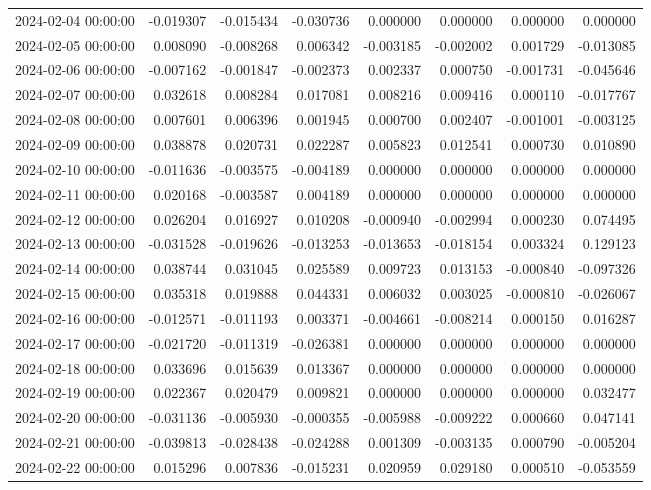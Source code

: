 \begin{tabular}{lrrrrrrr}
2024-02-04 00:00:00 & -0.019307 & -0.015434 & -0.030736 & 0.000000 & 0.000000 & 0.000000 & 0.000000 \\
2024-02-05 00:00:00 & 0.008090 & -0.008268 & 0.006342 & -0.003185 & -0.002002 & 0.001729 & -0.013085 \\
2024-02-06 00:00:00 & -0.007162 & -0.001847 & -0.002373 & 0.002337 & 0.000750 & -0.001731 & -0.045646 \\
2024-02-07 00:00:00 & 0.032618 & 0.008284 & 0.017081 & 0.008216 & 0.009416 & 0.000110 & -0.017767 \\
2024-02-08 00:00:00 & 0.007601 & 0.006396 & 0.001945 & 0.000700 & 0.002407 & -0.001001 & -0.003125 \\
2024-02-09 00:00:00 & 0.038878 & 0.020731 & 0.022287 & 0.005823 & 0.012541 & 0.000730 & 0.010890 \\
2024-02-10 00:00:00 & -0.011636 & -0.003575 & -0.004189 & 0.000000 & 0.000000 & 0.000000 & 0.000000 \\
2024-02-11 00:00:00 & 0.020168 & -0.003587 & 0.004189 & 0.000000 & 0.000000 & 0.000000 & 0.000000 \\
2024-02-12 00:00:00 & 0.026204 & 0.016927 & 0.010208 & -0.000940 & -0.002994 & 0.000230 & 0.074495 \\
2024-02-13 00:00:00 & -0.031528 & -0.019626 & -0.013253 & -0.013653 & -0.018154 & 0.003324 & 0.129123 \\
2024-02-14 00:00:00 & 0.038744 & 0.031045 & 0.025589 & 0.009723 & 0.013153 & -0.000840 & -0.097326 \\
2024-02-15 00:00:00 & 0.035318 & 0.019888 & 0.044331 & 0.006032 & 0.003025 & -0.000810 & -0.026067 \\
2024-02-16 00:00:00 & -0.012571 & -0.011193 & 0.003371 & -0.004661 & -0.008214 & 0.000150 & 0.016287 \\
2024-02-17 00:00:00 & -0.021720 & -0.011319 & -0.026381 & 0.000000 & 0.000000 & 0.000000 & 0.000000 \\
2024-02-18 00:00:00 & 0.033696 & 0.015639 & 0.013367 & 0.000000 & 0.000000 & 0.000000 & 0.000000 \\
2024-02-19 00:00:00 & 0.022367 & 0.020479 & 0.009821 & 0.000000 & 0.000000 & 0.000000 & 0.032477 \\
2024-02-20 00:00:00 & -0.031136 & -0.005930 & -0.000355 & -0.005988 & -0.009222 & 0.000660 & 0.047141 \\
2024-02-21 00:00:00 & -0.039813 & -0.028438 & -0.024288 & 0.001309 & -0.003135 & 0.000790 & -0.005204 \\
2024-02-22 00:00:00 & 0.015296 & 0.007836 & -0.015231 & 0.020959 & 0.029180 & 0.000510 & -0.053559 \\

\end{tabular}

